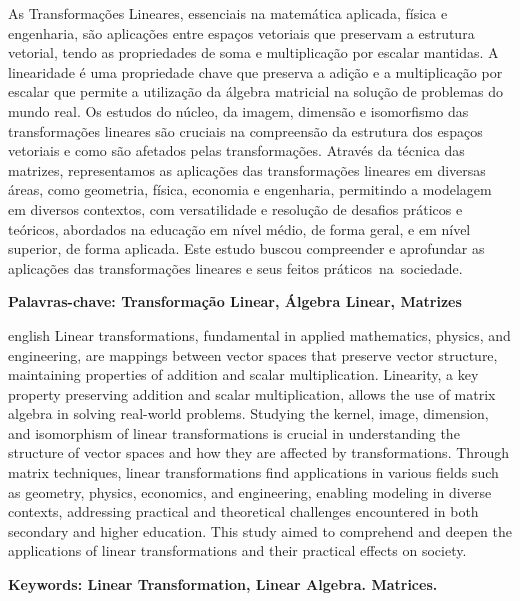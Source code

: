 \documentclass[
12pt,
 a4paper,
    english,
    brazil,
    oneside
    ]{abntex2}
\begin{document}
	
	\setlength{\absparsep}{18pt} %
	\begin{resumo}
		As Transformações Lineares, essenciais na matemática aplicada, física e engenharia, são aplicações entre espaços vetoriais que preservam a estrutura vetorial, tendo as propriedades de soma e multiplicação por escalar mantidas. A linearidade é uma propriedade chave que preserva a adição e a multiplicação por escalar que permite a utilização da álgebra matricial na solução de problemas do mundo real.
		Os estudos do núcleo, da imagem, dimensão e isomorfismo das transformações lineares são cruciais na compreensão da estrutura dos espaços vetoriais e como são afetados pelas transformações. 
		Através da técnica das matrizes, representamos as aplicações das transformações lineares em diversas áreas, como geometria, física, economia e engenharia, permitindo a modelagem em diversos contextos, com versatilidade e resolução de desafios práticos e teóricos, abordados na educação em nível médio, de forma geral, e em nível superior, de forma aplicada.
		Este estudo buscou compreender e aprofundar as aplicações das transformações lineares e seus feitos práticos na sociedade.
		
		\textbf{Palavras-chave: Transformação Linear, Álgebra Linear, Matrizes}
	\end{resumo}
		
	
	\begin{resumo}[Abstract]
		\begin{otherlanguage*}{english}
			Linear transformations, fundamental in applied mathematics, physics, and engineering, are mappings between vector spaces that preserve vector structure, maintaining properties of addition and scalar multiplication. Linearity, a key property preserving addition and scalar multiplication, allows the use of matrix algebra in solving real-world problems. Studying the kernel, image, dimension, and isomorphism of linear transformations is crucial in understanding the structure of vector spaces and how they are affected by transformations. Through matrix techniques, linear transformations find applications in various fields such as geometry, physics, economics, and engineering, enabling modeling in diverse contexts, addressing practical and theoretical challenges encountered in both secondary and higher education. This study aimed to comprehend and deepen the applications of linear transformations and their practical effects on society.
			
			\vspace{\onelineskip}
			
			\noindent 
			\textbf{Keywords: Linear Transformation, Linear Algebra. Matrices.}
		\end{otherlanguage*}
	\end{resumo}
	
\end{document}

